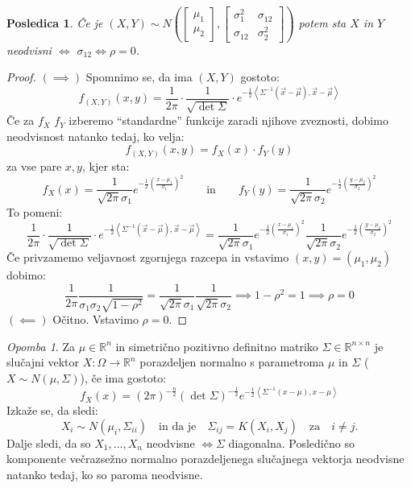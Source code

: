 \documentclass[12pt]{book}
\theoremstyle{definition}
\theoremstyle{plain}
\theoremstyle{plain}
\theoremstyle{plain}
\newtheorem{posledica}{Posledica}
\theoremstyle{remark}
\newtheorem*{opomba}{Opomba}
\begin{document}
\begin{posledica}
    Če je $(X,Y) \sim N\left(\begin{bmatrix}\mu_1 \\ \mu_2 \end{bmatrix}, \begin{bmatrix} \sigma_1^2 & \sigma_{12} \\ \sigma_{12} & \sigma_2^2 \end{bmatrix}\right)$ potem sta $X$ in $Y$ neodvisni $\iff$ $\sigma_{12} \iff \rho = 0$.
\end{posledica}

\begin{proof}
    $(\implies)$ Spomnimo se, da ima $(X,Y)$ gostoto:
    $$
    f_{(X,Y)}(x,y) = \frac{1}{2 \pi} \cdot \frac{1}{\sqrt{\det \Sigma}} \cdot e^{-\frac{1}{2}\left\langle\Sigma^{-1}\left(\vec{x} - \vec{\mu}\right), \vec{x} - \vec{\mu}\right\rangle}
    $$
    Če za $f_X$ $f_Y$ izberemo “standardne” funkcije zaradi njihove zveznosti, dobimo neodvisnost natanko tedaj, ko velja:
    $$
    f_{(X, Y)}(x, y)=f_X(x) \cdot f_Y(y)
    $$
    za vse pare $x, y$, kjer sta: 
    $$
    f_X(x)= \frac{1}{\sqrt{2 \pi} \sigma_1} e^{-\frac{1}{2}\left(\frac{x-\mu_1}{\sigma_1}\right)^2} \qquad \text{in} \qquad f_Y(y)=\frac{1}{\sqrt{2 \pi} \sigma_2} e^{-\frac{1}{2}\left(\frac{y-\mu_2}{\sigma_2}\right)^2}
    $$
    To pomeni: 
    $$
    \frac{1}{2 \pi} \cdot \frac{1}{\sqrt{\det \Sigma}} \cdot e^{-\frac{1}{2}\left\langle\Sigma^{-1}\left(\vec{x} - \vec{\mu}\right), \vec{x} - \vec{\mu}\right\rangle} = \frac{1}{\sqrt{2 \pi} \sigma_1} e^{-\frac{1}{2}\left(\frac{x-\mu_1}{\sigma_1}\right)^2} \frac{1}{\sqrt{2 \pi} \sigma_2} e^{-\frac{1}{2}\left(\frac{y-\mu_2}{\sigma_2}\right)^2}
    $$
    Če privzamemo veljavnost zgornjega razcepa in vstavimo $(x, y)=\left(\mu_1, \mu_2\right)$ dobimo:
    $$
    \frac{1}{2 \pi} \frac{1}{\sigma_1 \sigma_2 \sqrt{1 - \rho^2}}= \frac{1}{\sqrt{2 \pi} \sigma_1} \frac{1}{\sqrt{2 \pi} \sigma_2} \implies 1-\rho^2=1 \implies \rho=0
    $$
    $(\impliedby)$ Očitno. Vstavimo $\rho =0$.
\end{proof}

\begin{opomba}
    Za $\mu \in \mathbb{R}^n$ in simetrično pozitivno definitno matriko $\Sigma \in \mathbb{R}^{n \times n}$ je slučajni vektor $X: \Omega \rightarrow \mathbb{R}^n$ porazdeljen normalno s parametroma $\mu$ in $\Sigma$ ($X \sim N(\mu, \Sigma)$), če ima gostoto: 
    $$
    f_X(x)=(2 \pi)^{-\frac{n}{2}}(\det \Sigma)^{-\frac{1}{2}} e^{-\frac{1}{2}\left\langle\Sigma^{-1}(x-\mu), x-\mu\right\rangle}
    $$
    Izkaže se, da sledi:
    $$
    X_i \sim N\left(\mu_i, \Sigma_{i i}\right) \quad \text{in da je} \quad \Sigma_{i j}=K\left(X_i, X_j\right) \quad \text{za} \quad i \neq j.
    $$
    Dalje sledi, da so $X_1, \ldots, X_n$ neodvisne $\iff \Sigma$ diagonalna. Posledično so komponente večrazsežno normalno porazdeljenega slučajnega vektorja neodvisne natanko tedaj, ko so paroma neodvisne.
\end{opomba}
\end{document}
